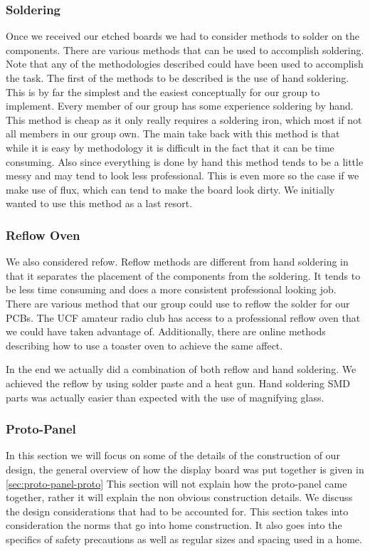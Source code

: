 \subsubsection{Soldering}
Once we received our etched boards we had to consider methods to solder on the
components. There are various methods that can be used to accomplish soldering.
Note that any of the methodologies described could have been used to accomplish the
task. The
first of the methods to be described is the use of hand soldering. This is by
far the simplest and the easiest conceptually for our group to implement. Every
member of our group has some experience soldering by hand. This method is cheap
as it only really requires a soldering iron, which most if not all members in
our group own.  The main take back with this method is that while it is easy by
methodology it is difficult in the fact that it can be time consuming.
Also since everything is done by hand this method tends to be a little messy
and may tend to look less professional. This is even
more so the case if we make use of flux, which can tend to make the board look
dirty. We initially wanted to use this method as a last resort.

\subsubsection{Reflow Oven}
We also considered refow. Reflow methods are different from hand soldering in that it separates the
placement of the components from the soldering. It tends to be less time
consuming and does a more consistent professional looking job. There are
various method that our group could use to reflow the solder for our PCBs. The
UCF amateur radio club has access to a professional reflow oven that we could have taken advantage of. Additionally, there are online methods describing how
to use a toaster oven to achieve the same affect.

In the end we actually did a combination of both reflow and hand soldering. We achieved the reflow by using solder paste and a heat gun. Hand soldering SMD parts was actually easier than expected with the use of magnifying glass.  

\subsubsection{Proto-Panel}
\label{sec:proto-panel}
In this section we will focus on some of the details of the construction of our
design, the general overview of how the display board was put together is
given in \autoref{sec:proto-panel-proto} This section will not explain how the
proto{}-panel came together, rather it will explain the non obvious
construction details. We discuss the design considerations that had to be
accounted for. This section takes into consideration the norms that go into
home construction. It also goes into the specifics of safety precautions as
well as regular sizes and spacing used in a home.

